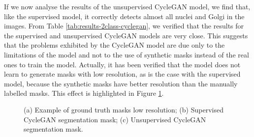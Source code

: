 If we now analyse the results of the unsupervised CycleGAN model, we find that, like the supervised model, it correctly detects almost all nuclei and Golgi in the images. From Table \ref{tab:results-2class-cyclegan}, we verified that the results for the supervised and unsupervised CycleGAN models are very close. This suggests that the problems exhibited by the CycleGAN model are due only to the limitations of the model and not to the use of synthetic masks instead of the real ones to train the model. Actually, it has been verified that the model does not learn to generate masks with low resolution, as is the case with the supervised model, because the synthetic masks have better resolution than the manually labelled masks. This effect is highlighted in Figure \ref{fig:lowresolution-cycleGAN}.


\begin{figure}[!htb]
  \centering
  \hfil
  \hfil 
 
  \caption{(a) Example of ground truth masks low resolution; (b) Supervised CycleGAN segmentation mask; (c) Unsupervised CycleGAN segmentation mask.}
  
  \label{fig:lowresolution-cycleGAN}
  
  \end{figure}


